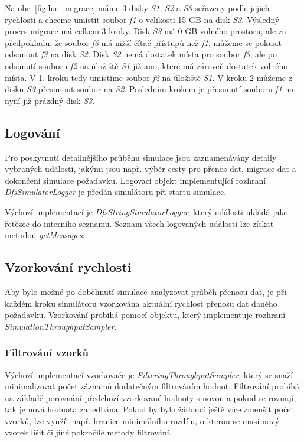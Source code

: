 \documentclass[czech,DP]{thesiskiv}
\begin{document}
Na obr. \ref{fig:hie_migrace} máme 3 disky \textit{S1}, \textit{S2} a \textit{S3} seřazeny podle jejich rychlosti a chceme umístit soubor \textit{f1} o velikosti 15 GB na disk \textit{S3}. Výsledný proces migrace má celkem 3 kroky. Disk \textit{S3} má 0 GB volného prostoru, ale za předpokladu, že soubor \textit{f3} má nižší čítač přístupů než \textit{f1}, můžeme se pokusit odsunout \textit{f3} na disk \textit{S2}. Disk \textit{S2} nemá dostatek místa pro soubor \textit{f3}, ale po odsunutí souboru \textit{f2} na úložiště \textit{S1} již ano, které má zároveň dostatek volného místa. V 1. kroku tedy umístíme soubor \textit{f2} na úložiště \textit{S1}. V kroku 2 můžeme z disku \textit{S3} přesunout soubor na \textit{S2}. Posledním krokem je přesunutí souboru \textit{f1} na nyní již prázdný disk \textit{S3}.

\subsection{Logování}

Pro poskytnutí detailnějšího průběhu simulace jsou zaznamenávány detaily vybraných událostí, jakými jsou např. výběr cesty pro přenos dat, migrace dat a dokončení simulace požadavku. Logovací objekt implementující rozhraní \textit{DfsSimulatorLogger} je předán simulátoru při startu simulace.

Výchozí implementací je \textit{DfsStringSimulatorLogger}, který události ukládá jako řetězec do interního seznamu. Seznam všech logovaných událostí lze získat metodou \textit{getMessages}.

\subsection{Vzorkování rychlosti}

Aby bylo možné po doběhnutí simulace analyzovat průběh přenosu dat, je při každém kroku simulátoru vzorkována aktuální rychlost přenosu dat daného požadavku. Vzorkování probíhá pomocí objektu, který implementuje rozhraní \textit{SimulationThroughputSampler}. 

\subsubsection*{Filtrování vzorků}

Výchozí implementací vzorkovače je \textit{FilteringThroughputSampler}, který se snaží minimalizovat počet záznamů dodatečným filtrováním hodnot. Filtrování probíhá na základě porovnání předchozí vzorkované hodnoty s novou a pokud se rovnají, tak je nová hodnota zanedbána. Pokud by bylo žádoucí ještě více zmenšit počet vzorků, lze využít např. hranice minimálního rozdílu, o kterou se musí nový vzorek lišit či jiné pokročilé metody filtrování.
\end{document}
